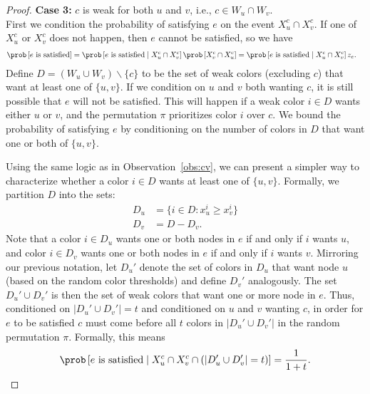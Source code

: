 \begin{proof}
	\noindent
	\textbf{Case 3:} $c$ is weak for both $u$ and $v$, i.e., $c \in W_u \cap W_v$.\\
	First we condition the probability of satisfying $e$ on the event $X_u^c \cap X_v^c$. If one of $X_u^c$ or $X_v^c$ does not happen, then $e$ cannot be satisfied, so we have
	\begin{align*}
		\prob\left[ \text{$e$ is satisfied} \right] & = \prob\left[ \text{$e$ is satisfied} \mid X_u^c \cap X_v^c \right] \prob\left[ X_v^c \cap X_u^c \right] = \prob\left[ \text{$e$ is satisfied} \mid X_u^c \cap X_v^c \right] z_e.
	\end{align*}
	Define $D = (W_u \cup W_v) \backslash \{c\}$ to be the set of weak colors (excluding $c$) that want at least one of $\{u,v\}$. If we condition on $u$ and $v$ both wanting $c$, it is still possible that $e$ will not be satisfied. This will happen if a weak color $i \in D$ wants either $u$ or $v$, and the permutation $\pi$ prioritizes color $i$ over $c$. We bound the probability of satisfying $e$ by conditioning on the number of colors in $D$ that want one or both of $\{u,v\}$.

	Using the same logic as in Observation~\ref{obs:cv}, we can present a simpler way to characterize whether a color $i \in D$ wants at least one of $\{u,v\}$. Formally, we partition $D$ into the sets:
	\begin{align*}
		D_u & = \{i \in D \colon x_u^i \geq x_v^i \} \\
		D_v & = D - D_v.
	\end{align*}
	Note that a color $i \in D_u$ wants one or both nodes in $e$ if and only if $i$ wants $u$, and color $i \in D_v$ wants one or both nodes in $e$ if and only if $i$ wants $v$.
	Mirroring our previous notation, let $D_u'$ denote the set of colors in $D_u$ that want node $u$ (based on the random color thresholds) and define $D_v'$ analogously. The set $D_u' \cup D_v'$ is then the set of weak colors that want one or more node in $e$. Thus, conditioned on $|D_u' \cup D_v'| = t$ and conditioned on $u$ and $v$ wanting $c$, in order for $e$ to be satisfied $c$ must come before all $t$ colors in $|D_u' \cup D_v'|$ in the random permutation $\pi$. Formally, this means
	\[
		\prob\left[ \text{$e$ is satisfied} \mid X_u^c \cap X_v^c \cap (|D'_u \cup D'_v| = t) \right] = \frac{1}{1 + t}.
	\]


\end{proof}
